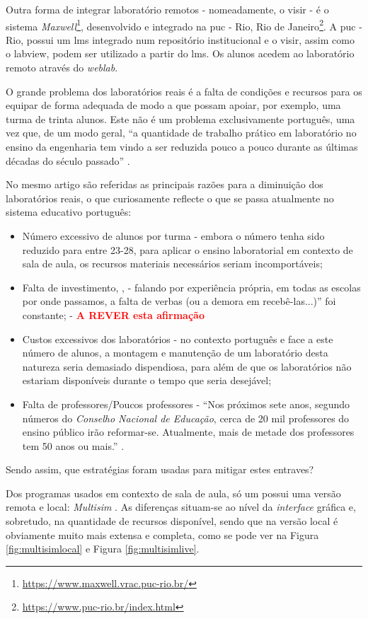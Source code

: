 Outra forma de integrar \acrshort{laboratório remoto}s - nomeadamente, o \acrshort{visir} - é o sistema \textit{Maxwell}\footnote{\url{https://www.maxwell.vrac.puc-rio.br/}}, desenvolvido e integrado na \acrfull{puc} - Rio, Rio de Janeiro\footnote{\url{https://www.puc-rio.br/index.html}}. A \acrshort{puc} - Rio, possui um \acrshort{lms} integrado num repositório institucional e o \acrshort{visir}, assim como o \acrshort{labview}, podem ser utilizado a partir do \acrshort{lms}. Os alunos acedem ao \acrshort{laboratório remoto} através do \textit{weblab}\cite{Alves}.

O grande problema dos laboratórios reais é a falta de condições e recursos para os equipar de forma adequada de modo a que possam apoiar, por exemplo, uma turma de trinta alunos. Este não é um problema exclusivamente português, uma vez que, de um modo geral, ``a quantidade de trabalho prático em laboratório no ensino da engenharia tem vindo a ser reduzida pouco a pouco durante as últimas décadas do século passado'' \cite{PaperTit40:online}.

No mesmo artigo \cite{PaperTit40:online} são referidas as principais razões para a diminuição dos laboratórios reais, o que curiosamente reflecte o que se passa atualmente no sistema educativo português:

\begin{itemize}
    \item Número excessivo de alunos por turma \cite{Reduçãod55:online} - embora o número tenha sido reduzido para entre 23-28, para aplicar o ensino laboratorial em contexto de sala de aula, os recursos materiais necessários seriam incomportáveis;
    \item Falta de investimento\cite{Faltadei99:online}, \cite{Odesinve56:online}, \cite{EDUSTATP20:online} - falando por experiência própria, em todas as escolas por onde passamos, a falta de verbas (ou a demora em recebê-las...)'' foi constante; - \textcolor{red}{\textbf{A REVER esta afirmação}}
    \item Custos excessivos dos laboratórios - no contexto português e face a este número de alunos, a montagem e manutenção de um laboratório desta natureza seria demasiado dispendiosa, para além de que os laboratórios não estariam disponíveis durante o tempo que seria desejável;
    \item Falta de professores/Poucos professores - ``Nos próximos sete anos, segundo números do \textit{Conselho Nacional de Educação}, cerca de 20 mil professores do ensino público irão reformar-se. Atualmente, mais de metade dos professores tem 50 anos ou mais.'' \cite{Faltaded39:online}.
\end{itemize}

Sendo assim, que estratégias foram usadas para mitigar estes entraves?


Dos programas usados em contexto de sala de aula, só um possui uma versão remota e local: \textit{Multisim} \cite{multisim}. As diferenças situam-se ao nível da \textit{interface} gráfica e, sobretudo, na quantidade de recursos disponível, sendo que na versão local é obviamente muito mais extensa e completa, como se pode ver na Figura \ref{fig:multisimlocal} e Figura \ref{fig:multisimlive}.
